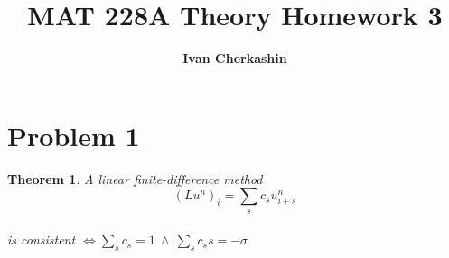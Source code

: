 \documentclass[a4paper]{amsproc}
\title[MAT 228A Theory Homework 3]{MAT 228A Theory Homework 3}
\author[Cherkashin]{\bfseries Ivan Cherkashin}
\theoremstyle{plain}
\newtheorem*{thm}{Theorem}
\theoremstyle{definition}
\theoremstyle{remark}
\numberwithin{equation}{section}
\begin{document}
\vspace{18mm} \setcounter{page}{1} \thispagestyle{empty}



\maketitle

\section*{Problem 1}

\begin{thm} \label{} 
A linear finite-difference method $$(Lu^n)_i = \sum\limits_{s} c_s u^{n}_{i+s}$$ \\ is consistent $ \Longleftrightarrow 
\sum\limits_{s} c_s = 1 ~ \wedge ~ \sum\limits_{s} c_s s = -\sigma$

\end{thm}
\end{document}
